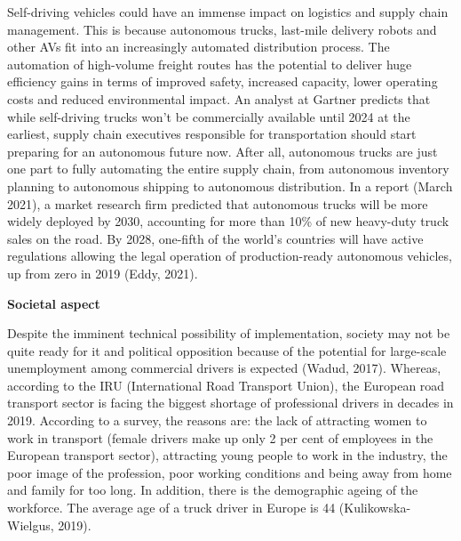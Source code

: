 \documentclass[
]{book}
\begin{document}
Self-driving vehicles could have an immense impact on logistics and supply chain management. This is because autonomous trucks, last-mile delivery robots and other AVs fit into an increasingly automated distribution process. The automation of high-volume freight routes has the potential to deliver huge efficiency gains in terms of improved safety, increased capacity, lower operating costs and reduced environmental impact. An analyst at Gartner predicts that while self-driving trucks won't be commercially available until 2024 at the earliest, supply chain executives responsible for transportation should start preparing for an autonomous future now. After all, autonomous trucks are just one part to fully automating the entire supply chain, from autonomous inventory planning to autonomous shipping to autonomous distribution. In a report (March 2021), a market research firm predicted that autonomous trucks will be more widely deployed by 2030, accounting for more than 10\% of new heavy-duty truck sales on the road. By 2028, one-fifth of the world's countries will have active regulations allowing the legal operation of production-ready autonomous vehicles, up from zero in 2019 (Eddy, 2021).

\textbf{Societal aspect}

Despite the imminent technical possibility of implementation, society may not be quite ready for it and political opposition because of the potential for large-scale unemployment among commercial drivers is expected (Wadud, 2017). Whereas, according to the IRU (International Road Transport Union), the European road transport sector is facing the biggest shortage of professional drivers in decades in 2019. According to a survey, the reasons are: the lack of attracting women to work in transport (female drivers make up only 2 per cent of employees in the European transport sector), attracting young people to work in the industry, the poor image of the profession, poor working conditions and being away from home and family for too long. In addition, there is the demographic ageing of the workforce. The average age of a truck driver in Europe is 44 (Kulikowska-Wielgus, 2019).
\end{document}
